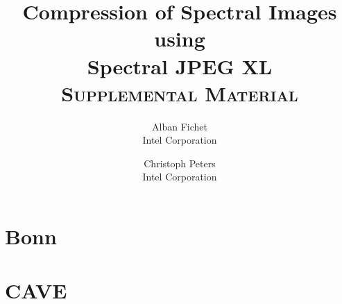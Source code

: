 \documentclass{article}
\author{Alban Fichet\\Intel Corporation \and Christoph Peters\\Intel Corporation}
\title{\textbf{Compression of Spectral Images using\\Spectral JPEG XL}\\ \vspace{12pt}\large{\textsc{Supplemental Material}}}
\date{}
\begin{document}
\maketitle

\tableofcontents
\clearpage



\section{Bonn}



\section{CAVE}


\end{document}
